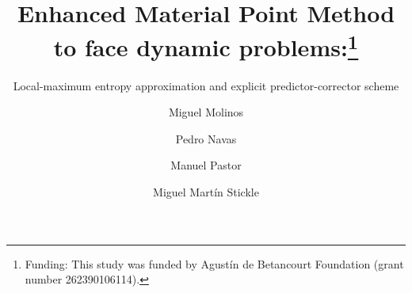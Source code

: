 
%

\newcommand{\Matrix}[1]{
  \ensuremath{\mathbf{{#1}}}
}
\newcommand{\Vector}[1]{
  \ensuremath{\mathbf{{#1}}}
}

\newcommand{\Div}[1]{
  \ensuremath{div({#1})}
}
\newcommand\Grad[1]{grad({#1})}
\newcommand\GradS[1]{grad^s({#1})}
\newcommand\GradT[1]{grad^T({#1})}


\newcommand{\Deriv}[3][]{
  \ensuremath{\frac{\partial^{#1}{#2}}{ \partial {#3}^{#1} }}
}

\newcommand{\Integral}[2]{
  \IfStrEqCase{#1}{
    {2}{\ensuremath{\int_{\varGamma_d}{#2}\ d\varGamma}}
    {3}{\ensuremath{\int_{\varOmega}{#2}\ d\varOmega}}
  }
}

%
%



\title{Enhanced Material Point Method to face
  dynamic problems:\thanks{Funding: This
    study was funded by Agustín de Betancourt Foundation (grant number
    262390106114).}
}
\subtitle{Local-maximum entropy approximation and explicit
  predictor-corrector scheme}


\author{Miguel Molinos \and
  Pedro Navas \and
  Manuel Pastor \and
  Miguel Martín Stickle
}




